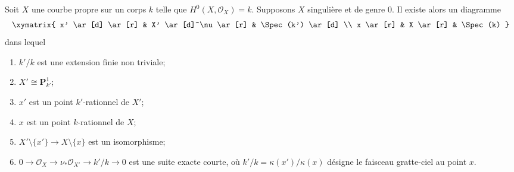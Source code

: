\begin{lemma}
\label{lemma-genus-zero-singular}
Soit $X$ une courbe propre sur un corps $k$ telle que $H^0(X, \mathcal{O}_X) = k$. Supposons $X$ singulière et de genre $0$. Il existe alors un diagramme $$
\xymatrix{
x' \ar[d] \ar[r] & X' \ar[d]^\nu \ar[r] & \Spec(k') \ar[d] \\
x \ar[r] & X \ar[r] & \Spec(k)
}
$$ dans lequel \begin{enumerate} \item $k'/k$ est une extension finie non triviale; \item $X' \cong \mathbf{P}^1_{k'}$; \item $x'$ est un point $k'$-rationnel de $X'$; \item $x$ est un point $k$-rationnel de $X$; \item $X' \setminus \{x'\} \to X \setminus \{x\}$ est un isomorphisme; \item $0 \to \mathcal{O}_X \to \nu_*\mathcal{O}_{X'} \to k'/k \to 0$ est une suite exacte courte, où $k'/k = \kappa(x')/\kappa(x)$ désigne le faisceau gratte-ciel au point $x$.
\end{enumerate}
\end{lemma}

